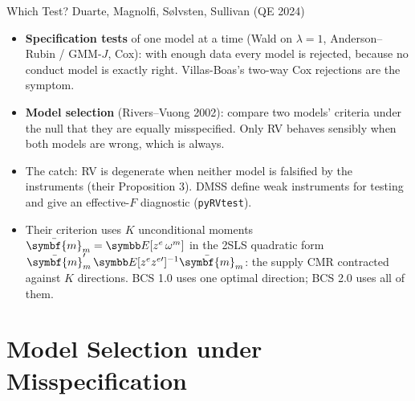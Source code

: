 \documentclass[aspectratio=169,10pt]{beamer}
\begin{document}
\begin{frame}{Which Test? Duarte, Magnolfi, S\o lvsten, Sullivan (QE 2024)}
\small
\begin{itemize}
\item \textbf{Specification tests} of one model at a time (Wald on $\lambda=1$, Anderson--Rubin / GMM-$J$, Cox): with enough data \alert{every} model is rejected, because no conduct model is exactly right. Villas-Boas's two-way Cox rejections are the symptom.
\item \textbf{Model selection} (Rivers--Vuong 2002): compare two models' criteria under the null that they are \alert{equally} misspecified. Only RV behaves sensibly when both models are wrong, which is always.
\item The catch: RV is \alert{degenerate} when \alert{neither} model is falsified by the instruments (their Proposition 3). DMSS define \alert{weak instruments for testing} and give an effective-$F$ diagnostic (\texttt{pyRVtest}).
\item Their criterion uses $K$ unconditional moments $\bar{\symbf{m}}_m = \E[z^e\, \omega^m]$ in the 2SLS quadratic form $\bar{\symbf{m}}_m' \,\E[z^e z^{e\prime}]^{-1} \bar{\symbf{m}}_m$: the supply CMR contracted against $K$ directions. BCS 1.0 uses \alert{one} optimal direction; BCS 2.0 uses \alert{all} of them.
\end{itemize}
\end{frame}


\section{Model Selection under Misspecification}
\end{document}
